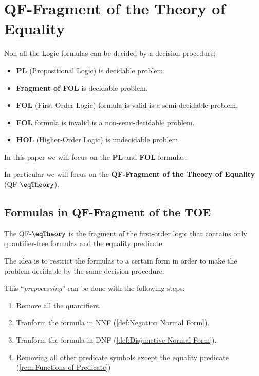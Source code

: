 \chapter{QF-Fragment of the Theory of Equality}
\label{cha:QF-Fragment of the Theory of Equality}

Non all the Logic formulas can be decided by a decision procedure:
\begin{itemize}
    \item \textbf{PL} (Propositional Logic) is decidable problem.
    \item \textbf{Fragment of FOL} is decidable problem.
    \item \textbf{FOL} (First-Order Logic) formula is valid is a semi-decidable problem.
    \item \textbf{FOL} formula is invalid is a non-semi-decidable problem.
    \item \textbf{HOL} (Higher-Order Logic) is undecidable problem.
\end{itemize}

In this paper we will focus on the \textbf{PL} and \textbf{FOL} formulas.

In particular we will focus on the \textbf{QF-Fragment of the Theory of Equality}
(QF-$\eqTheory$).

\section{Formulas in QF-Fragment of the TOE}
\label{sec:Formulas in QF-Fragment of the TOE}

The QF-$\eqTheory$ is the fragment of the first-order logic that contains only
quantifier-free formulas and the equality predicate.

The idea is to restrict the formulas to a certain form 
in order to make the problem decidable by the same decision procedure.

This ``\textit{prepocessing}'' can be done with the following steps:
\begin{enumerate}
    \item Remove all the quantifiers.
    \item Tranform the formula in NNF (\ref{def:Negation Normal Form}).
    \item Tranform the formula in DNF (\ref{def:Disjunctive Normal Form}).
    \item Removing all other predicate symbols except the equality predicate
    (\ref{rem:Functions of Predicate})
\end{enumerate}

